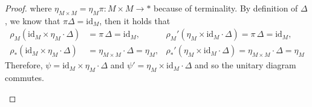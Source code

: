 \documentclass[ 12pt ]{article}
\begin{document}
\begin{enumerate}
\begin{proof}
			where $\eta_{M \times M} = \eta_M \pi : M \times M \to \ast$ because of terminality. By definition of $\Delta$, we know that $\pi \Delta = \mathrm{id}_M$, then it holds that
			\begin{align*}
				\rho_M (\mathrm{id}_M \times \eta_M \cdot \Delta) &= \pi\, \Delta = \mathrm{id}_M, & \rho_M' (\eta_M \times \mathrm{id}_M \cdot \Delta) = \pi\, \Delta = \mathrm{id}_M, \\
				\rho_\ast (\mathrm{id}_M \times \eta_M \cdot \Delta) &= \eta_{M \times M} \cdot \Delta = \eta_M, & \rho_\ast' (\eta_M \times \mathrm{id}_M \cdot \Delta) = \eta_{M \times M} \cdot \Delta = \eta_M
			\end{align*}
			Therefore, $\psi = \mathrm{id}_M \times \eta_M \cdot \Delta$ and $\psi' = \eta_M \times \mathrm{id}_M \cdot \Delta$ and so the unitary diagram commutes.
			\begin{center}
			\end{center}
		\end{proof}

\end{enumerate}
\end{document}
